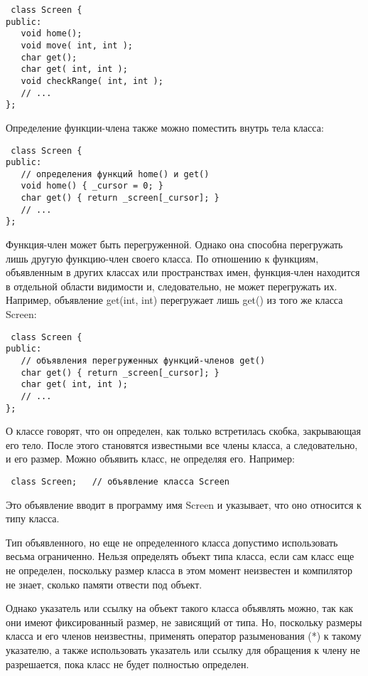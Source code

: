 \documentclass[a4paper,report,14pt]{ncc}
\begin{document}
\begin{verbatim}
 class Screen {
public:
   void home();
   void move( int, int );
   char get();
   char get( int, int );
   void checkRange( int, int );
   // ...
};
\end{verbatim}


Определение функции-члена также можно поместить внутрь тела класса:

\begin{verbatim}
 class Screen {
public:
   // определения функций home() и get()
   void home() { _cursor = 0; }
   char get() { return _screen[_cursor]; }
   // ...
};
\end{verbatim}

Функция-член может быть перегруженной. Однако она способна перегружать лишь другую функцию-член своего класса. По отношению к функциям, объявленным в других классах или пространствах имен, функция-член находится в отдельной области видимости и, следовательно, не может перегружать их. Например, объявление get(int, int) перегружает лишь get() из того же класса Screen:

\begin{verbatim}
 class Screen {
public:
   // объявления перегруженных функций-членов get()
   char get() { return _screen[_cursor]; }
   char get( int, int );
   // ...
};
\end{verbatim}

О классе говорят, что он определен, как только встретилась скобка, закрывающая его тело. После этого становятся известными все члены класса, а следовательно, и его размер. 
Можно объявить класс, не определяя его. Например:

\begin{verbatim}
 class Screen;   // объявление класса Screen
\end{verbatim}

Это объявление вводит в программу имя Screen и указывает, что оно относится к типу класса.

Тип объявленного, но еще не определенного класса допустимо использовать весьма ограниченно. Нельзя определять объект типа класса, если сам класс еще не определен, поскольку размер класса в этом момент неизвестен и компилятор не знает, сколько памяти отвести под объект.

Однако указатель или ссылку на объект такого класса объявлять можно, так как они имеют фиксированный размер, не зависящий от типа. Но, поскольку размеры класса и его членов неизвестны, применять оператор разыменования (*) к такому указателю, а также использовать указатель или ссылку для обращения к члену не разрешается, пока класс не будет полностью определен.
\end{document}

